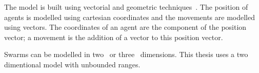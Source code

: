 The model is built using vectorial and geometric techniques~\cite{HER:11, BAF:06}. The position of agents is modelled using cartesian coordinates and the movements are modelled using vectors. The coordinates of an agent are the component of the position vector; a movement is the addition of a vector to this position vector.


Swarms can be modelled in two~\cite{MIN:07, VY:04} or three~\cite{BSB:15} dimensions.
This thesis uses a two dimentional model with unbounded ranges.
                                

